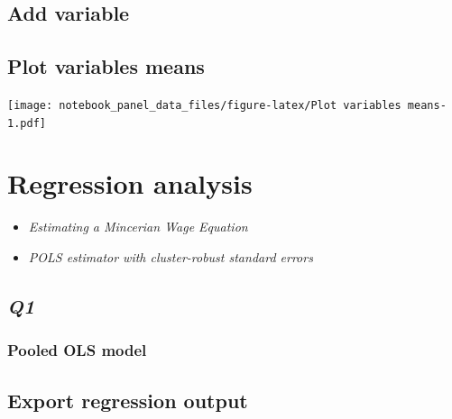 \documentclass[
]{article}
\begin{document}
\hypertarget{add-variable}{%
\subsection{Add variable}\label{add-variable}}

\hypertarget{plot-variables-means}{%
\subsection{Plot variables means}\label{plot-variables-means}}

\texttt{[image: notebook\_panel\_data\_files/figure-latex/Plot variables means-1.pdf]}

\hypertarget{regression-analysis}{%
\section{Regression analysis}\label{regression-analysis}}

\begin{itemize}
\item
  \emph{Estimating a Mincerian Wage Equation}
\item
  \emph{POLS estimator with cluster-robust standard errors}
\end{itemize}

\hypertarget{q1}{%
\subsection{\texorpdfstring{\emph{Q1}}{Q1}}\label{q1}}

\hypertarget{pooled-ols-model}{%
\subsubsection{Pooled OLS model}\label{pooled-ols-model}}

\hypertarget{export-regression-output}{%
\subsection{Export regression output}\label{export-regression-output}}
\end{document}
